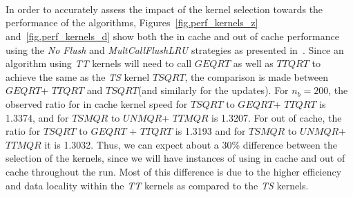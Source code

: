 \documentclass[a4paper,twopages]{article}
\newcommand{\GEQRT}{\ensuremath{\mathit{GEQRT}}\xspace}
\newcommand{\TSQRT}{\ensuremath{\mathit{TSQRT}}\xspace}
\newcommand{\UNMQR}{\ensuremath{\mathit{UNMQR}}\xspace}
\newcommand{\TSMQR}{\ensuremath{\mathit{TSMQR}}\xspace}
\newcommand{\TTQRT}{\ensuremath{\mathit{TTQRT}}\xspace}
\newcommand{\TTMQR}{\ensuremath{\mathit{TTMQR}}\xspace}
\begin{document}
\begin{sidewaysfigure*}
\centering
\begin{minipage}{0.48\linewidth}
\\
    \caption{\label{fig.perf_kernels_z} Kernel performance for double complex precision}
\end{minipage}
~~
\begin{minipage}{0.48\linewidth}
\\
    \caption{\label{fig.perf_kernels_d} Kernel performance for double precision}
\end{minipage}
\end{sidewaysfigure*}

In order to accurately assess the impact of the kernel selection towards the
performance of the algorithms, Figures~\ref{fig.perf_kernels_z}
and~\ref{fig.perf_kernels_d} show both the in cache and out of cache
performance using the \emph{No Flush} and \emph{MultCallFlushLRU} strategies as
presented in~\cite{lawn242,Whaley:2008:AAC:1462062.1462065}.  Since an
algorithm using \emph{TT} kernels will need to call
\GEQRT as well as \TTQRT to achieve the same as the \emph{TS} kernel \TSQRT, the comparison is made
between \GEQRT + \TTQRT and \TSQRT (and similarly for the updates).  For $n_b=200$, the observed ratio for in
cache kernel speed for \TSQRT to \GEQRT + \TTQRT is 1.3374, and for \TSMQR to
\UNMQR + \TTMQR is 1.3207. For out of cache, the ratio for \TSQRT to \GEQRT
+ \TTQRT is 1.3193 and for \TSMQR to \UNMQR + \TTMQR it is 1.3032.  Thus, we
can expect about a 30\% difference between the selection of the kernels, since
we will have instances of using in cache and out of cache throughout the run.
Most of this difference is due to the higher efficiency and data locality
within the \emph{TT} kernels as compared to the
\emph{TS} kernels.


\begin{sidewaysfigure*}
\centering
{}
\\
\caption{\label{fig.fig_aa_pic1_p40}
Predicted and experimental performance of QR factorization - All kernels}
\end{sidewaysfigure*}
\end{document}
